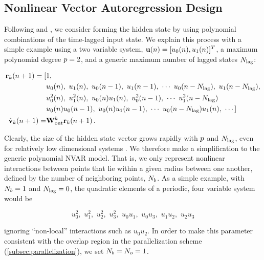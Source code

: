 \subsection{Nonlinear Vector Autoregression Design}
\label{subsec:nvar}

Following \citet{gauthier_next_2021} and \citet{chen_next_2022}, we consider forming the hidden state by using polynomial combinations of the time-lagged input state.
We explain this process with a simple example using a two variable system,
$\mathbf{u}(n) = [u_0(n), u_1(n)]^T$,
a maximum polynomial degree
$p=2$, and a generic maximum number of lagged states $N_\text{lag}$:
\begin{linenomath*}\begin{equation}
    \begin{aligned}
        \mathbf{r}_{k}(n+1)
        =
        [&1, \\
         &u_0(n), \,\, u_1(n), \,\,
        u_0(n-1),\,\, u_1(n-1), \,\,
        \cdots \,\,
        u_0(n-N_\text{lag}), \,\, u_1(n-N_\text{lag}), \\
         &u_0^2(n), \,\, u_1^2(n), \,\, u_0(n)u_1(n), \,\,
        u_0^2(n-1), \,\, \cdots \,\, u_1^2(n-N_\text{lag}) \\
         &u_0(n)u_0(n-1), \,\,
        u_0(n)u_1(n-1), \,\, \cdots \,\, u_0(n-N_\text{lag})u_1(n), \,\,\cdots
        ] \\
        \hat{\mathbf{v}}_{k}(n+1) = &\mathbf{W}_\text{out}^{k} \mathbf{r}_{k}(n+1) \, .
    \end{aligned}
\end{equation}\end{linenomath*}
Clearly, the size of the hidden state vector grows rapidly with
$p$ and $N_\text{lag}$,
even for relatively low dimensional systems
\citep<see supplemental material of>[for explicit calculations]{chen_next_2022}.
We therefore make a simplification to the generic polynomial NVAR model.
That is, we only represent nonlinear interactions between points that lie
within a given radius between one another, defined by the number of neighboring
points, $N_{b}$.
As a simple example, with $N_{b}=1$ and $N_\text{lag}=0$, the quadratic elements of a periodic, four variable
system would be
\begin{linenomath*}\begin{equation*}
    u_0^2, \,\, u_1^2, \,\, u_2^2, \,\, u_3^2, \,\,
    u_0u_1, \,\, u_0u_3, \,\, u_1u_2, \,\, u_2u_3
\end{equation*}\end{linenomath*}
ignoring ``non-local'' interactions such as $u_0u_2$.
In order to make this parameter consistent with the overlap region in the parallelization scheme (\cref{subsec:parallelization}),
we set $N_{b} = N_{o} = 1$.

